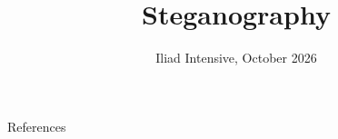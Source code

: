 \documentclass[aspectratio=169]{beamer}
\title{Steganography}
\subtitle{\coursetitle}
\author{\instructor}
\date{Iliad Intensive, October 2026}
\begin{document}
\begin{frame}
\titlepage
\end{frame}

\navoverview







\begin{frame}[allowframebreaks]{References}
\printbibliography[heading=none]
\end{frame}
\end{document}
